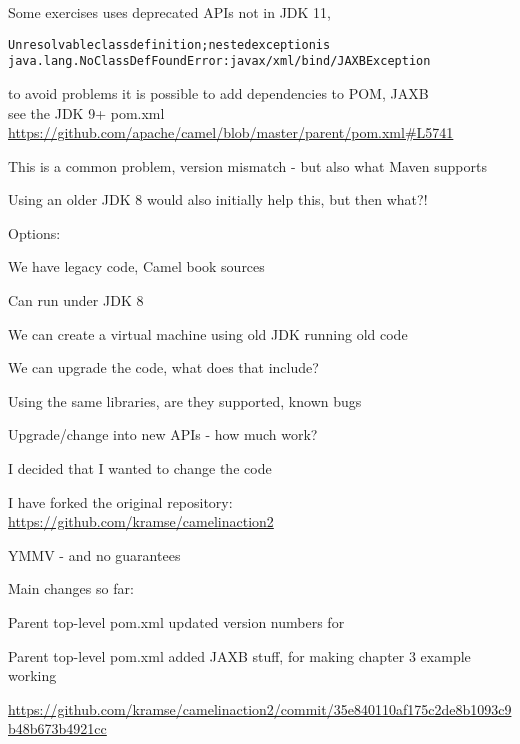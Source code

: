 \documentclass[Screen16to9,17pt]{foils}
\begin{document}

Some exercises uses deprecated APIs not in JDK 11,
\begin{alltt}
Unresolvable class definition; nested exception is
java.lang.NoClassDefFoundError: javax/xml/bind/JAXBException
\end{alltt}

\begin{list2}
\item to avoid problems it is possible to add dependencies to POM, JAXB\\
see the JDK 9+ pom.xml \url{https://github.com/apache/camel/blob/master/parent/pom.xml#L5741}
\item This is a common problem, version mismatch - but also what Maven supports
\item Using an older JDK 8 would also initially help this, but then what?!
\end{list2}


Options:
\begin{list2}
\item We have legacy code, Camel book sources
\item Can run under JDK 8
\item We can create a virtual machine using old JDK running old code
\vskip 2cm
\item We can upgrade the code, what does that include?
\item Using the same libraries, are they supported, known bugs
\item Upgrade/change into new APIs - how much work?
\end{list2}



I decided that I wanted to change the code \smiley

I have forked the original repository:\\
\url{https://github.com/kramse/camelinaction2}

YMMV - and no guarantees

Main changes so far:
\begin{list2}
\item Parent top-level pom.xml updated version numbers for
\item Parent top-level pom.xml added JAXB stuff, for making chapter 3 example working
\item \url{https://github.com/kramse/camelinaction2/commit/35e840110af175c2de8b1093c9b48b673b4921cc}
\end{list2}
\end{document}
